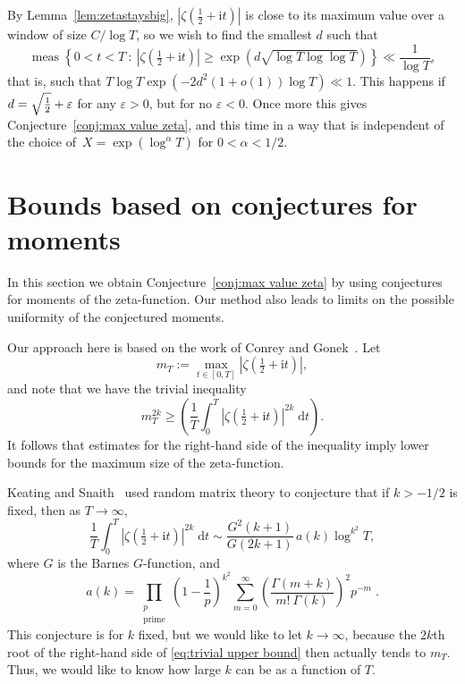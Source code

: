 \documentclass[10pt,reqno,twoside]{amsart}
\renewcommand{\d}{{\mathrm{d}}} %
\renewcommand{\i}{{\mathrm{i}}} %
\DeclareMathOperator{\meas}{meas}
\numberwithin{equation}{section}
\numberwithin{theorem}{section}
\begin{document}
{{By Lemma~\ref{lem:zetastaysbig}, $|\zeta(\frac12+\i t)|$ is close
to its maximum value over a window of size $C/\log T$, so we wish
to find the smallest $d$ such that
\begin{equation}
\meas\left\{ 0<t<T \ : \  |\zeta(\tfrac{1}{2}+\i t)| \geq \exp(d
\sqrt{\log T \log\log T}) \right\} \ll  \frac{1}{\log T},
\end{equation}
that is, such that  $T \log T \exp(-2d^2 (1+o(1))\log T) \ll  1$.
This happens if $d=\sqrt{\mathstrut \frac12}+\varepsilon$ for any
$\varepsilon>0$, but for no $\varepsilon<0$. Once more this gives
Conjecture~\ref{conj:max value zeta}, and this time in a way that
is independent of the choice of~$X=\exp(\log^{\alpha}T)$ for
$0<\alpha<1/2$.






\section{Bounds based on conjectures for
moments}\label{sect:moments}


In this section we obtain Conjecture~\ref{conj:max value zeta}
by using conjectures for moments of the
zeta-function.  Our method also leads to limits on the
possible uniformity of the conjectured moments.

Our approach here is based on the work of
Conrey and Gonek~\cite{ConGon}.
Let
\begin{equation}
m_T := \max_{t \in [0,T]} |\zeta(\tfrac12+\i t)|,
\end{equation}
and note that we have the trivial inequality
\begin{equation}\label{eq:trivial upper bound}
m_T^{2k} \geq \left( \frac{1}{T} \int_0^T |\zeta(\tfrac12 +\i
t)|^{2k} \;\d t \right).
\end{equation}
It follows that estimates for the right-hand side of the
inequality imply lower bounds for the maximum size of the
zeta-function.

Keating and Snaith~\cite{KeaSna}
used random matrix theory to conjecture that if
$k>-1/2$ is fixed, then as $T\to\infty$,
\begin{equation}
 \label{conj:KS}
\frac{1}{T} \int_0^T |\zeta(\tfrac12+\i t)|^{2k} \;\d t \sim
\frac{G^2(k+1)}{G(2k+1)} \, a(k) \log^{k^2} T,
\end{equation}
where $G$ is the Barnes $G$-function, and
\begin{equation}
a(k) = \prod_{\substack{p\\ \text{prime}}}
\left(1-\frac{1}{p}\right)^{k^2} \sum_{m=0}^\infty
\left(\frac{\Gamma(m+k)}{m! \ \Gamma(k)}\right)^{\!2} p^{-m} \; .
\end{equation}
This conjecture is for $k$ fixed, but we would like to let
$k\to\infty$, because the $2k$th root of the right-hand side of
\eqref{eq:trivial upper bound} then actually tends to $m_T$.
Thus, we would like to know how large $k$ can be
as a function of $T$.

}}
\end{document}
